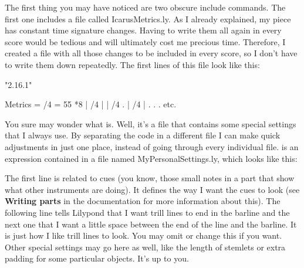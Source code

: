 \documentclass[../../LilyPond-Tutorials]{subfiles}
\begin{document}
The first thing you may have noticed are two obscure include commands. 
The first one includes a file called IcarusMetrics.ly. 
As I already explained, my piece has constant time signature changes.
Having to write them all again in every score would be tedious and will ultimately cost me precious time.
Therefore, I created a file with all those changes to be included in every score, so I don't have to write them down repeatedly.
The first lines of this file look like this:

\begin{lilypondcode}
\version "2.16.1"

Metrics = {
  /4  = 55 *8 | %
  /4  | %
   | %
  /4 . | %
  /4  | %
  .
  .
  .
  etc.
}
\end{lilypondcode}


You sure may wonder what  is.
Well, it's a file that contains some special settings that I always use.
By separating the code in a different file I can make quick adjustments in just one place, instead of going through every individual file.
 is an expression contained in a file named MyPersonalSettings.ly, which looks like this:



The first line is related to cues (you know, those small notes in a part that show what other instruments are doing).
It defines the way I want the cues to look (see \textbf{Writing parts} in the documentation for more information about this).
The following line tells Lilypond that I want trill lines to end in the barline and the next one that I want a little space between the end of the line and the barline.
It is just how I like trill lines to look.
You may omit or change this if you want.
Other special settings may go here as well, like the length of stemlets or extra padding for some particular objects.
It's up to you.
\end{document}
